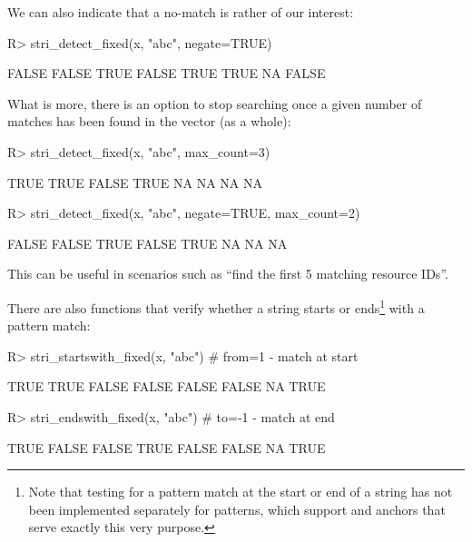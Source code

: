 \documentclass[nojss]{jss}
\begin{document}
We can also indicate that a no-match is rather of our  interest:

\begin{Schunk}
\begin{Sinput}
R> stri_detect_fixed(x, "abc", negate=TRUE)
\end{Sinput}
\begin{Soutput}
[1] FALSE FALSE  TRUE FALSE  TRUE  TRUE    NA FALSE
\end{Soutput}
\end{Schunk}

What is more, there is an option to stop searching
once a given number of matches has been found
in the  vector (as a whole):

\begin{Schunk}
\begin{Sinput}
R> stri_detect_fixed(x, "abc", max_count=3)
\end{Sinput}
\begin{Soutput}
[1]  TRUE  TRUE FALSE  TRUE    NA    NA    NA    NA
\end{Soutput}
\begin{Sinput}
R> stri_detect_fixed(x, "abc", negate=TRUE, max_count=2)
\end{Sinput}
\begin{Soutput}
[1] FALSE FALSE  TRUE FALSE  TRUE    NA    NA    NA
\end{Soutput}
\end{Schunk}

\noindent
This can be useful in scenarios such as ``find the first 5 matching
resource IDs''.


\medskip
There are also functions that verify whether a string
starts or ends\footnote{Note that testing for a pattern match at the start
or end of a string has not been implemented separately for  patterns,
which support  and  anchors that  serve exactly this very purpose.}
with a pattern match:

\begin{Schunk}
\begin{Sinput}
R> stri_startswith_fixed(x, "abc")  # from=1 - match at start
\end{Sinput}
\begin{Soutput}
[1]  TRUE  TRUE FALSE FALSE FALSE FALSE    NA  TRUE
\end{Soutput}
\begin{Sinput}
R> stri_endswith_fixed(x, "abc")    # to=-1 - match at end
\end{Sinput}
\begin{Soutput}
[1]  TRUE FALSE FALSE  TRUE FALSE FALSE    NA  TRUE
\end{Soutput}
\end{Schunk}
\end{document}
